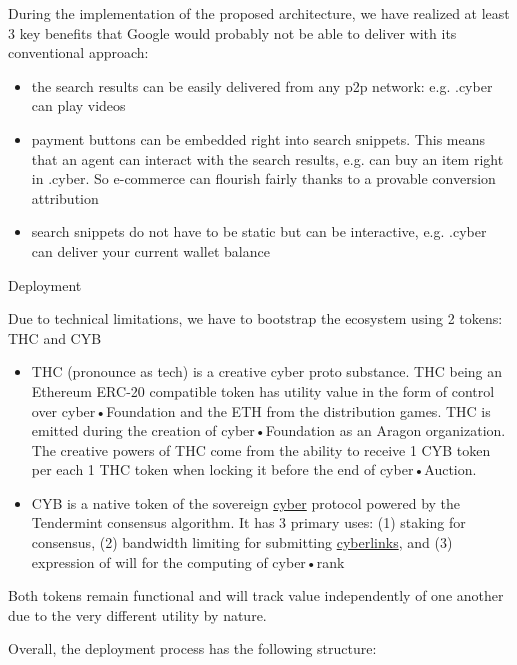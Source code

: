 \documentclass[8pt,oneside]{amsart}
\makeatletter
\renewcommand\subsection{\@startsection{subsection}
                                    {2}{\z@}
                                    {-3.25ex\@plus -1ex \@minus -.2ex}
                                    {0ex \@plus .2ex}
                                    {\play\Large}
                        }
\newcommand{\titleSection}[1]{\subsection{#1}}
\makeatother
\begin{document}
During the implementation of the proposed architecture, we have realized at least 3 key benefits that Google would probably not be able to deliver with its conventional approach:

\begin{itemize}
\item the search results can be easily delivered from any p2p network: e.g. .cyber can play videos
\item payment buttons can be embedded right into search snippets. This means that an agent can interact with the search results, e.g. can buy an item right in .cyber. So e-commerce can flourish fairly thanks to a provable conversion attribution
\item search snippets do not have to be static but can be interactive, e.g. .cyber can deliver your current wallet balance
\end{itemize}

\titleSection{Deployment}\label{deployment}

Due to technical limitations, we have to bootstrap the ecosystem using 2 tokens: THC and CYB

\begin{itemize}
\item THC (pronounce as tech) is a creative cyber proto substance. THC being an Ethereum ERC-20 compatible token has utility value in the form of control over cyber•Foundation and the ETH from the distribution games. THC is emitted during the creation of cyber•Foundation as an Aragon organization. The creative powers of THC come from the ability to receive 1 CYB token per each 1 THC token when locking it before the end of cyber•Auction.
\item CYB is a native token of the sovereign {\hyperref[cyber]{cyber}} protocol powered by the Tendermint consensus algorithm. It has 3 primary uses: (1) staking for consensus, (2) bandwidth limiting for submitting {\hyperref[cyberlinks]{cyberlinks}}, and (3) expression of will for the computing of cyber•rank
\end{itemize}

Both tokens remain functional and will track value independently of one another due to the very different utility by nature.

Overall, the deployment process has the following structure:
\end{document}
